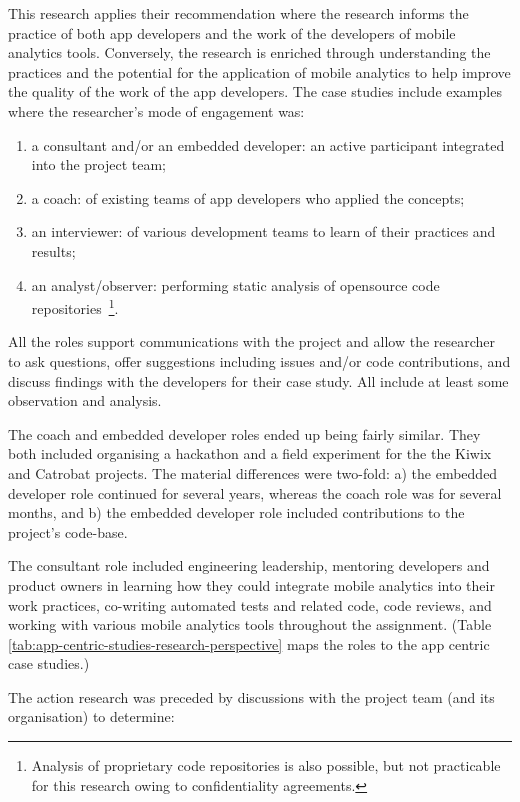 This research applies their recommendation where the research informs the practice of both app developers and the work of the developers of mobile analytics tools. Conversely, the research is enriched through understanding the practices and the potential for the application of mobile analytics to help improve the quality of the work of the app developers. The case studies include examples where the researcher's mode of engagement was:
\begin{enumerate}
    \itemsep0em
    \item a consultant and/or an embedded developer: an active participant integrated into the project team;
    \item a coach: of existing teams of app developers who applied the concepts;
    \item an interviewer: of various development teams to learn of their practices and results;
    \item an analyst/observer: performing static analysis of opensource code repositories~\footnote{Analysis of proprietary code repositories is also possible, but not practicable for this research owing to confidentiality agreements.}.
\end{enumerate}

All the roles support communications with the project and allow the researcher to ask questions, offer suggestions including issues and/or code contributions, and discuss findings with the developers for their case study. All include at least some observation and analysis. 

The coach and embedded developer roles ended up being fairly similar. They both included organising a hackathon and a field experiment for the the Kiwix and Catrobat projects. The material differences were two-fold: a) the embedded developer role continued for several years, whereas the coach role was for several months, and b) the embedded developer role included contributions to the project's code-base.

The consultant role included engineering leadership, mentoring developers and product owners in learning how they could integrate mobile analytics into their work practices, co-writing automated tests and related code, code reviews, and working with various mobile analytics tools throughout the assignment. (Table \ref{tab:app-centric-studies-research-perspective} maps the roles to the app centric case studies.)

The action research was preceded by discussions with the project team (and its organisation) to determine: 

